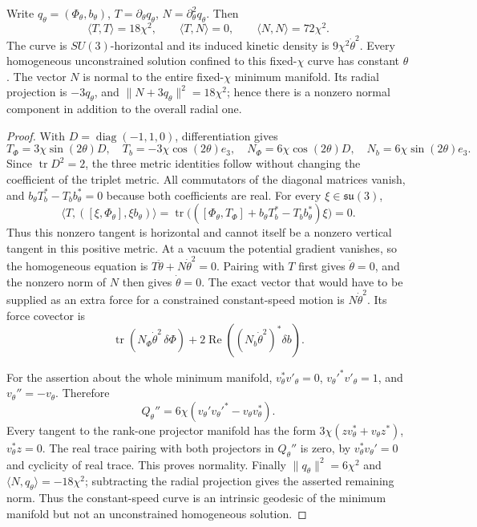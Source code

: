 \begin{proposition}
\label{q444:vk-horizontal}
Write \(q_\theta=(\Phi_\theta,b_\theta)\),
\(T=\partial_\theta q_\theta\), \(N=\partial_\theta^2q_\theta\).
Then
\[
 \langle T,T\rangle=18\chi^2,\qquad
 \langle T,N\rangle=0,\qquad
 \langle N,N\rangle=72\chi^2 .
\]
The curve is \(SU(3)\)-horizontal and its induced kinetic density is
\(9\chi^2\dot\theta^2\). Every homogeneous unconstrained solution
confined to this fixed-\(\chi\) curve has constant \(\theta\).
The vector \(N\) is normal to the entire fixed-\(\chi\) minimum
manifold. Its radial projection is \(-3q_\theta\), and
\(\|N+3q_\theta\|^2=18\chi^2\); hence there is a nonzero normal
component in addition to the overall radial one.
\end{proposition}
\begin{proof}
With \(D=\operatorname{diag}(-1,1,0)\), differentiation gives
\[
 T_\Phi=3\chi\sin(2\theta)D,\quad T_b=-3\chi\cos(2\theta)e_3,
 \quad
 N_\Phi=6\chi\cos(2\theta)D,\quad N_b=6\chi\sin(2\theta)e_3.
\]
Since \(\operatorname{tr}D^2=2\), the three metric identities follow
without changing the coefficient of the triplet metric.
All commutators of the diagonal matrices vanish, and
\(b_\theta T_b^*-T_b b_\theta^*=0\) because both coefficients are real.
For every \(\xi\in\mathfrak{su}(3)\),
\[
 \langle T,([\xi,\Phi_\theta],\xi b_\theta)\rangle
 =\operatorname{tr}\bigl(
   ([\Phi_\theta,T_\Phi]+b_\theta T_b^*-T_b b_\theta^*)\xi\bigr)=0.
\]
Thus this nonzero tangent is horizontal and cannot itself be a
nonzero vertical tangent in this positive metric.
At a vacuum the potential gradient vanishes, so the homogeneous
equation is \(T\ddot\theta+N\dot\theta^2=0\).
Pairing with \(T\) first gives \(\ddot\theta=0\), and the nonzero
norm of \(N\) then gives \(\dot\theta=0\).
The exact vector that would have to be supplied as an extra force
for a constrained constant-speed motion is \(N\dot\theta^2\).
Its force covector is
\[
 \operatorname{tr}(N_\Phi\dot\theta^2\,\delta\Phi)
       +2\operatorname{Re}((N_b\dot\theta^2)^*\delta b).
\]

For the assertion about the whole minimum manifold,
\(v_\theta^*v'_\theta=0\), \(v_\theta'^*v'_\theta=1\), and
\(v_\theta''=-v_\theta\). Therefore
\[
 Q_\theta''=6\chi(v_\theta'v_\theta'^*-v_\theta v_\theta^*).
\]
Every tangent to the rank-one projector manifold has the form
\(3\chi(zv_\theta^*+v_\theta z^*)\), \(v_\theta^*z=0\).
The real trace pairing with both projectors in \(Q_\theta''\)
is zero, by \(v_\theta^*v_\theta'=0\) and cyclicity of real trace.
This proves normality. Finally
\(\|q_\theta\|^2=6\chi^2\) and
\(\langle N,q_\theta\rangle=-18\chi^2\); subtracting the radial
projection gives the asserted remaining norm.
Thus the constant-speed curve is an intrinsic geodesic of the
minimum manifold but not an unconstrained homogeneous solution.
\end{proof}

